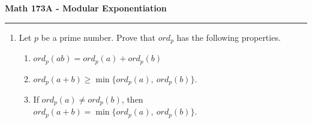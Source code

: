 \documentclass[11pt,letterpaper]{article}
\begin{document}
\begin{center}
{\bf \Large Math 173A - Modular Exponentiation}
\vspace{0.2cm}
\hrule
\end{center}

\begin{enumerate}

    \item Let $p$ be a prime number. Prove that $ord_p$ has the following properties.
    \begin{enumerate}
        \item $ord_p(ab) = ord_p(a) + ord_p(b)$
        \item $ord_p(a + b) \geq \min\{ord_p(a),\ ord_p(b)\}$.
        \item If $ord_p(a)\neq ord_p(b)$, then $ord_p(a+b) = \min\{ord_p(a),\ ord_p(b)\}$.

    \end{enumerate}

\end{enumerate}
\end{document}
